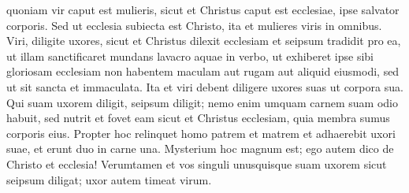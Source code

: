\begin{biblechapter}
\begin{biblechapter}
\begin{biblechapter}
\begin{biblechapter}
\begin{biblechapter}
\verse quoniam vir caput est mulieris, sicut et Christus caput est ecclesiae, ipse salvator corporis. 
\verse Sed ut ecclesia subiecta est Christo, ita et mulieres viris in omnibus.
 \verse Viri, diligite uxores, sicut et Christus dilexit ecclesiam et seipsum tradidit pro ea, 
\verse ut illam sanctificaret mundans lavacro aquae in verbo, 
 \verse ut exhiberet ipse sibi gloriosam ecclesiam non habentem maculam aut rugam aut aliquid eiusmodi, sed ut sit sancta et immaculata. 
\verse Ita et viri debent diligere uxores suas ut corpora sua. Qui suam uxorem diligit, seipsum diligit; 
\verse nemo enim umquam carnem suam odio habuit, sed nutrit et fovet eam sicut et Christus ecclesiam, 
\verse quia membra sumus corporis eius. 
\verse Propter hoc relinquet homo patrem et matrem et adhaerebit uxori suae, et erunt duo in carne una. 
\verse Mysterium hoc magnum est; ego autem dico de Christo et ecclesia! 
\verse Verumtamen et vos singuli unusquisque suam uxorem sicut seipsum diligat; uxor autem timeat virum.
 

\end{biblechapter}
\end{biblechapter}
\end{biblechapter}
\end{biblechapter}
\end{biblechapter}
